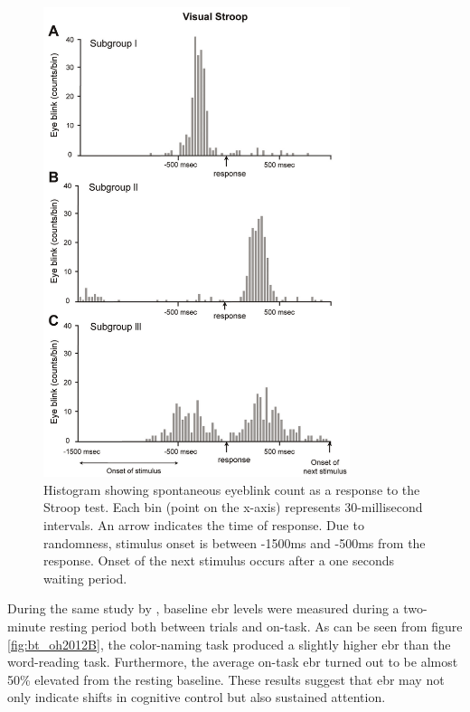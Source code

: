 \begin{figure}[h]
    \centering
    \includegraphics[width=0.8\textwidth]{figures/bt_oh2012A.png}
    \caption{Histogram showing spontaneous eyeblink count as a response to the Stroop test. Each bin (point on the x-axis) represents 30-millisecond intervals. An arrow indicates the time of response. Due to randomness, stimulus onset is between -1500ms and -500ms from the response. Onset of the next stimulus occurs after a one seconds waiting period.}
    \label{fig:bt_oh2012A}
\end{figure}

During the same study by \textcite{oh2012}, baseline \acrshort{ebr} levels were measured during a two-minute resting period both between trials and on-task. As can be seen from figure \ref{fig:bt_oh2012B}, the color-naming task produced a slightly higher \acrshort{ebr} than the word-reading task. Furthermore, the average on-task \acrshort{ebr} turned out to be almost 50\% elevated from the resting baseline. These results suggest that \acrshort{ebr} may not only indicate shifts in cognitive control but also sustained attention.

